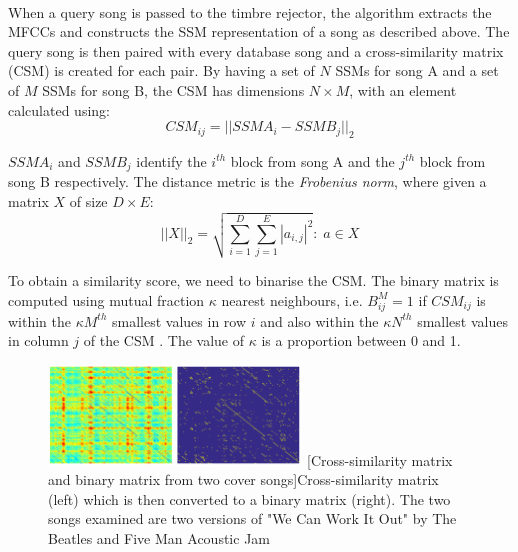 \paragraph{}
When a query song is passed to the timbre rejector, the algorithm extracts the
MFCCs and constructs the SSM representation of a song as described above. The
query song is then paired with every database song and a cross-similarity matrix
(CSM) is created for each pair. By having a set of $N$ SSMs for song A and a set
of $M$ SSMs for song B, the CSM has dimensions $N \times M$, with an element
calculated using:
\begin{equation}
    CSM_{ij} = ||SSMA_i - SSMB_j||_2
\end{equation}

$SSMA_i$ and $SSMB_j$ identify the $i^{th}$ block from song A and the $j^{th}$
block from song B respectively. The distance metric is the \textit{Frobenius
norm}, where given a matrix $X$ of size $D \times E$:
\begin{equation}
    ||X||_2 = \sqrt{\sum_{i=1}^D\sum_{j=1}^E|a_{i, j}|^2} : \; a \in X
\end{equation}

To obtain a similarity score, we need to binarise the CSM. The binary matrix is
computed using mutual fraction $\kappa$ nearest neighbours, i.e. $B^M_{ij} = 1$
if $CSM_{ij}$ is within the $\kappa M^{th}$ smallest values in row $i$ and also
within the $\kappa N^{th}$ smallest values in column $j$ of the CSM
\cite{tralie2015cover}. The value of $\kappa$ is a proportion between 0 and 1.

\begin{figure}[H]
    \centering
    \includegraphics[width=0.6\textwidth]{Algorithms/csmbm.png}
    [Cross-similarity matrix and binary matrix from two cover songs]{Cross-similarity matrix (left) which is then converted to a binary matrix (right). The two songs examined are two versions of "We Can Work It Out" by The Beatles and Five Man Acoustic Jam \cite{tralie2015cover}}
    \label{fig:csmbm}
\end{figure}

